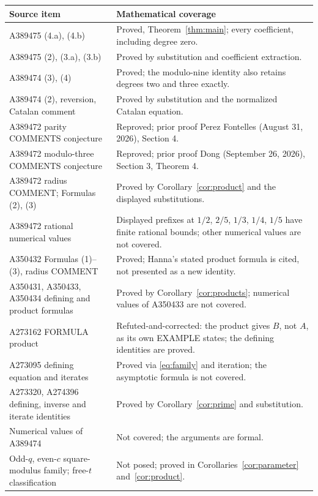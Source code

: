 \documentclass[11pt]{article}
\begin{document}
\noindent
\begin{longtable}{@{}p{}p{}@{}}
\toprule
Source item & Mathematical coverage\\
\midrule
\endhead
A389475 (4.a), (4.b) & Proved, Theorem~\ref{thm:main}; every coefficient,
including degree zero.\\
A389475 (2), (3.a), (3.b) & Proved by substitution and coefficient extraction.\\
A389474 (3), (4) & Proved; the modulo-nine identity also retains degrees
two and three exactly.\\
A389474 (2), reversion, Catalan comment & Proved by substitution and the
normalized Catalan equation.\\
A389472 parity COMMENTS conjecture & Reproved; prior proof Perez
Fontelles (August 31, 2026), Section 4.\\
A389472 modulo-three COMMENTS conjecture & Reproved; prior proof Dong
(September 26, 2026), Section 3, Theorem 4.\\
A389472 radius COMMENT; Formulas (2), (3) & Proved by
Corollary~\ref{cor:product} and the displayed substitutions.\\
A389472 rational numerical values & Displayed prefixes at $1/2$, $2/5$,
$1/3$, $1/4$, $1/5$ have finite rational bounds; other numerical values
are not covered.\\
A350432 Formulas (1)--(3), radius COMMENT & Proved; Hanna's stated product
formula is cited, not presented as a new identity.\\
A350431, A350433, A350434 defining and product formulas & Proved by
Corollary~\ref{cor:products}; numerical values of A350433 are not covered.\\
A273162 FORMULA product & Refuted-and-corrected: the product gives $B$,
not $A$, as its own EXAMPLE states; the defining identities are proved.\\
A273095 defining equation and iterates & Proved via \eqref{eq:family} and
iteration; the asymptotic formula is not covered.\\
A273320, A274396 defining, inverse and iterate identities & Proved by
Corollary~\ref{cor:prime} and substitution.\\
Numerical values of A389474 & Not covered; the arguments are formal.\\
Odd-$q$, even-$c$ square-modulus family; free-$t$ classification & Not posed;
proved in Corollaries~\ref{cor:parameter} and~\ref{cor:product}.\\
\bottomrule
\end{longtable}
\end{document}
